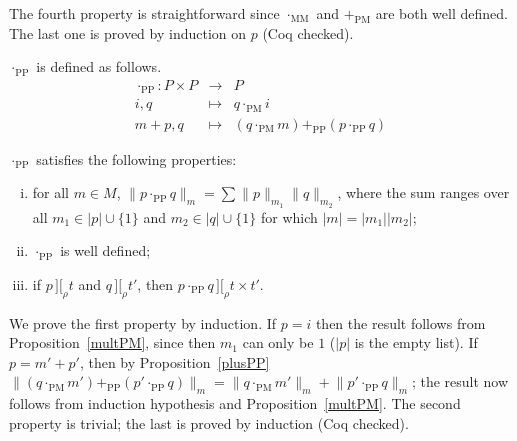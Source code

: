 \documentclass[numreferences]{kluwer}
\newcommand{\intII}{\,]\![}
\newcommand{\intrel}{\mathbin{\intII_{\rho}}}
\newcommand{\coeff}[2]{\ensuremath{\|#2\|_{#1}}}
\newcommand{\multMM}{\ensuremath{\cdot_{\mathrm{MM}}}}
\newcommand{\plusPM}{\ensuremath{+_{\mathrm{PM}}}}
\newcommand{\plusPP}{\ensuremath{+_{\mathrm{PP}}}}
\newcommand{\multPM}{\ensuremath{\cdot_{\mathrm{PM}}}}
\newcommand{\multPP}{\ensuremath{\cdot_{\mathrm{PP}}}}
\begin{document}
\begin{article}
\begin{pf}
The fourth property is straightforward since {\multMM} and {\plusPM} are
both well defined.  The last one is proved by induction on $p$
(Coq checked).
\end{pf}

\begin{definition}\label{defn:multPP} {\multPP} is defined as follows.
\begin{eqnarray*}
\multPP : P\times P & \to & P \\
 i, q & \mapsto & q\multPM i \\
 m+p, q & \mapsto & (q\multPM m)\plusPP (p\multPP q)
\end{eqnarray*}
\end{definition}

\begin{proposition}\label{multPP}
{\multPP} satisfies the following properties:
\begin{enumerate}[(i)]
\item for all $m\in M$, $\coeff m{p\multPP q}=\sum\coeff{m_1}p\coeff{m_2}q$,
where the sum ranges over all $m_1\in|p|\cup\{1\}$ and
$m_2\in|q|\cup\{1\}$ for which $|m|=|m_1||m_2|$;
\item {\multPP} is well defined;
\item if $p\intrel t$ and $q\intrel t'$, then $p\multPP q\intrel t\times t'$.
\end{enumerate}
\end{proposition}
\begin{pf}
We prove the first property by induction.  If $p=i$ then the result follows
from Proposition~\ref{multPM}, since then $m_1$ can only be $1$ ($|p|$ is the
empty list).
If $p=m'+p'$, then by Proposition~\ref{plusPP}
$\coeff m{(q\multPM m')\plusPP(p'\multPP q)}=%
\coeff m{q\multPM m'}+\coeff m{p'\multPP q}$; the result now follows from
induction hypothesis and Proposition~\ref{multPM}.
The second property is trivial; the last is proved by induction (Coq checked).
\end{pf}


\end{article}
\end{document}
